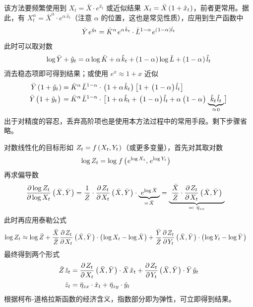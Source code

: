 该方法要频繁使用到 \(X_t=\bar X\cdot e^{\hat x_t}\) 或近似结果 \(X_t=\bar X\left(\mspace{1mu}1+\hat x_t\mspace{1mu}\right)\)，前者更常用。据此，有 \(X^\alpha_t=\bar X^\alpha\cdot e^{\alpha\,\hat x_t}\)（注意 \(\alpha\) 的位置，这也是常见性质），应用到生产函数中
\begin{align*}
    \bar Y\,e^{\hat y_t}=\bar K^\alpha\,e^{\alpha\,\hat k_t}\cdot \bar L^{1-\alpha}\,e^{\bka{1-\alpha}\hat l_t}
\end{align*}
此时可以取对数
\begin{align*}
    {\log\bar Y}+\hat y_t={\alpha\log\bar K}+\alpha\,\hat k_t+{\bka{1-\alpha}\log\bar L}+\bka{1-\alpha}\hat l_t
\end{align*}
消去稳态项即可得到结果；或使用 \(e^x\approx 1+x\) 近似
\begin{align*}
    \bar Y\bka{1+\hat y_t}&=\bar K^\alpha\,\bar L^{1-\alpha}\cdot\pa{1+\alpha\,\hat k_t}\ps{1+\pa{1-\alpha}\hat l_t}\\
    \bar Y\pa{1+\hat y_t}&=\bar K^\alpha\,\bar L^{1-\alpha}\cdot\ps{1+\alpha\,\hat k_t + \pa{1-\alpha}\hat l_t + \alpha\,\pa{1-\alpha}\underbrace{ \ \hat k_t\,\hat l_t \ }_{\approx \, 0}}
\end{align*}
出于对精度的容忍，丢弃高阶项也是使用本方法过程中的常用手段。剩下步骤省略。

\myskip
{}\label{sec:LogLinearGeneralMethod}

对数线性化的目标形如 \(Z_t=f\left(\mspace{1mu} X_t,Y_t\mspace{1mu}\right)\)（或更多变量），首先对其取对数
\begin{align*}
    & \log Z_t=\log \, f\bka{e^{\log X_t}, \,e^{\log Y_t}}
\end{align*}
再求偏导数
\begin{align*}
    & \dfrac{\partial\log Z_t}{\partial\log X_t}\bka{\bar X,\bar Y}= \dfrac1{\bar Z}\cdot\dfrac{\p Z_t}{\p X_t}\bka{\bar X,\bar Y}\cdot \underbrace{ \ e^{\log \bar X} \ }_{=\,\bar X}=\underbrace{ \ \dfrac{\bar X}{\bar Z}\cdot\dfrac{\p Z_t}{\p X_t}\bka{\bar X,\bar Y} \ }_{\eqcolon\ \bar \eta_{zx}}
\end{align*}
此时再应用泰勒公式
\begin{align*}
    \operatorname{log} Z_t&\approx\operatorname{log}\bar Z+\dfrac{\bar X}{\bar Z}\dfrac{\partial\mspace{2mu} Z_t}{\partial\mspace{2mu} X_t}\left(\mspace{1mu}\bar X,\bar Y\mspace{1mu}\right)\cdot\left(\mspace{1mu}\operatorname{log} X_t-\operatorname{log}\bar X\mspace{1mu}\right)+\dfrac{\bar Y}{\bar Z}\dfrac{\partial\mspace{2mu} Z_t}{\partial\mspace{2mu} Y_t}\left(\mspace{1mu}\bar X,\bar Y\mspace{1mu}\right)\cdot\left(\mspace{1mu}\operatorname{log} Y_t-\operatorname{log}\bar Y\mspace{1mu}\right)
\end{align*}
最终得到两个形式
\begin{align*}
    \bar Z\,\hat z_t&=\dfrac{\p Z_t}{\p X_t}\bka{\bar X,\bar Y}\cdot\bar X\,\hat x_t+\dfrac{\p Z_t}{\p Y_t}\bka{\bar X,\bar Y}\cdot\bar Y\,\hat y_t\\
    \hat z_t&=\bar\eta_{zx}\cdot\hat x_t+\bar\eta_{zy}\cdot\hat y_t
\end{align*}
根据柯布-道格拉斯函数的经济含义，指数部分即为弹性，可立即得到结果。

